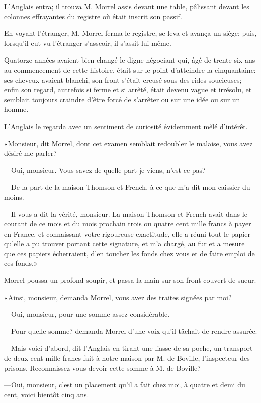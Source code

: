 L'Anglais entra; il trouva M. Morrel assis devant une table, pâlissant devant les colonnes effrayantes du registre où était inscrit son passif.

En voyant l'étranger, M. Morrel ferma le registre, se leva et avança un siège; puis, lorsqu'il eut vu l'étranger s'asseoir, il s'assit lui-même.

Quatorze années avaient bien changé le digne négociant qui, âgé de trente-six ans au commencement de cette histoire, était sur le point d'atteindre la cinquantaine: ses cheveux avaient blanchi, son front s'était creusé sous des rides soucieuses; enfin son regard, autrefois si ferme et si arrêté, était devenu vague et irrésolu, et semblait toujours craindre d'être forcé de s'arrêter ou sur une idée ou sur un homme.

L'Anglais le regarda avec un sentiment de curiosité évidemment mêlé d'intérêt.

«Monsieur, dit Morrel, dont cet examen semblait redoubler le malaise, vous avez désiré me parler?

—Oui, monsieur. Vous savez de quelle part je viens, n'est-ce pas?

—De la part de la maison Thomson et French, à ce que m'a dit mon caissier du moins.

—Il vous a dit la vérité, monsieur. La maison Thomson et French avait dans le courant de ce mois et du mois prochain trois ou quatre cent mille francs à payer en France, et connaissant votre rigoureuse exactitude, elle a réuni tout le papier qu'elle a pu trouver portant cette signature, et m'a chargé, au fur et a mesure que ces papiers écherraient, d'en toucher les fonds chez vous et de faire emploi de ces fonds.»

Morrel poussa un profond soupir, et passa la main sur son front couvert de sueur.

«Ainsi, monsieur, demanda Morrel, vous avez des traites signées par moi?

—Oui, monsieur, pour une somme assez considérable.

—Pour quelle somme? demanda Morrel d'une voix qu'il tâchait de rendre assurée.

—Mais voici d'abord, dit l'Anglais en tirant une liasse de sa poche, un transport de deux cent mille francs fait à notre maison par M. de Boville, l'inspecteur des prisons. Reconnaissez-vous devoir cette somme à M. de Boville?

—Oui, monsieur, c'est un placement qu'il a fait chez moi, à quatre et demi du cent, voici bientôt cinq ans.


